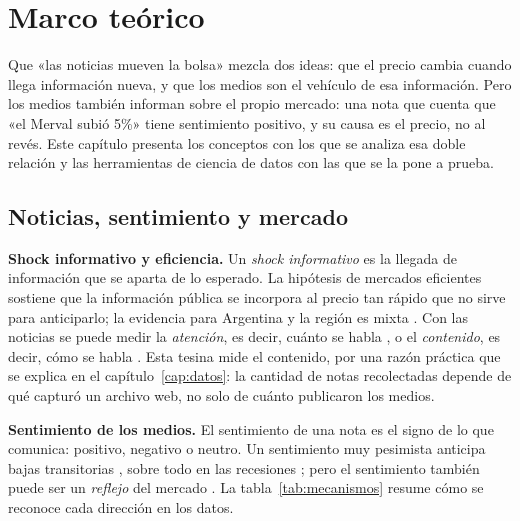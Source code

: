 \chapter{Marco teórico}
\label{cap:marco}

Que «las noticias mueven la bolsa» mezcla dos ideas: que el precio cambia cuando llega
información nueva, y que los medios son el vehículo de esa información. Pero los medios también
informan sobre el propio mercado: una nota que cuenta que «el Merval subió 5\%» tiene sentimiento
positivo, y su causa es el precio, no al revés. Este capítulo presenta los conceptos con los que
se analiza esa doble relación y las herramientas de ciencia de datos con las que se la pone a
prueba.

\section{Noticias, sentimiento y mercado}

\textbf{Shock informativo y eficiencia.} Un \textit{shock informativo} es la llegada de
información que se aparta de lo esperado. La hipótesis de mercados eficientes \citep{fama1970}
sostiene que la información pública se incorpora al precio tan rápido que no sirve para
anticiparlo; la evidencia para Argentina y la región es mixta \citep{zablotsky2002}. Con las
noticias se puede medir la \textit{atención}, es decir, cuánto se habla \citep{da2011,fang2009}, o
el \textit{contenido}, es decir, cómo se habla \citep{tetlock2007,ardia2022}. Esta tesina mide el
contenido, por una razón práctica que se explica en el capítulo~\ref{cap:datos}: la cantidad de
notas recolectadas depende de qué capturó un archivo web, no solo de cuánto publicaron los medios.

\textbf{Sentimiento de los medios.} El sentimiento de una nota es el signo de lo que comunica:
positivo, negativo o neutro. Un sentimiento muy pesimista anticipa bajas transitorias
\citep{tetlock2007}, sobre todo en las recesiones \citep{garcia2013}; pero el sentimiento también
puede ser un \textit{reflejo} del mercado \citep{verma2026}. La tabla~\ref{tab:mecanismos} resume
cómo se reconoce cada dirección en los datos.

